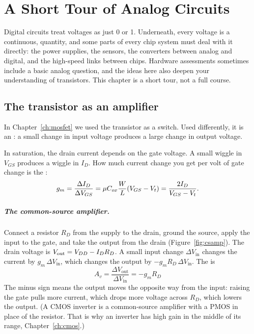 \chapter{A Short Tour of Analog Circuits}
\label{ch:analog}

Digital circuits treat voltages as just 0 or 1. Underneath, every voltage is a continuous,  quantity, and some parts of every chip system must deal with it directly: the power supplies, the sensors, the converters between analog and digital, and the high-speed links between chips. Hardware assessments sometimes include a basic analog question, and the ideas here also deepen your understanding of transistors. This chapter is a short tour, not a full course.

\section{The transistor as an amplifier}

In Chapter~\ref{ch:mosfet} we used the transistor as a switch. Used differently, it is an : a small change in input voltage produces a large change in output voltage.

In saturation, the drain current depends on the gate voltage. A small wiggle in $V_{GS}$ produces a wiggle in $I_D$. How much current change you get per volt of gate change is the :
\[
  g_m = \frac{\Delta I_D}{\Delta V_{GS}} = \mu C_{ox}\frac{W}{L}(V_{GS}-V_{t}) = \frac{2 I_D}{V_{GS}-V_{t}}.
\]

\paragraph{The common-source amplifier.} Connect a resistor $R_D$ from the supply to the drain, ground the source, apply the input to the gate, and take the output from the drain (Figure~\ref{fig:csamp}). The drain voltage is $V_{\text{out}} = V_{DD} - I_D R_D$. A small input change $\Delta V_{\text{in}}$ changes the current by $g_m\,\Delta V_{\text{in}}$, which changes the output by $-g_m R_D\,\Delta V_{\text{in}}$. The  is
\[
  \boxed{A_v = \frac{\Delta V_{\text{out}}}{\Delta V_{\text{in}}} = -g_m R_D}
\]
The minus sign means the output moves the opposite way from the input: raising the gate pulls more current, which drops more voltage across $R_D$, which lowers the output. (A CMOS inverter is a common-source amplifier with a PMOS in place of the resistor. That is why an inverter has high gain in the middle of its range, Chapter~\ref{ch:cmos}.)

